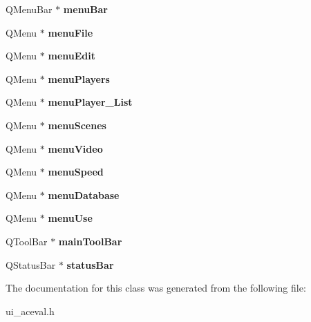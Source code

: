 \begin{DoxyCompactItemize}
\item 
\hypertarget{classUi__AceVal_a7ead7f0196975fdbfb7b5a7733d103f7}{Q\-Menu\-Bar $\ast$ {\bfseries menu\-Bar}}\label{classUi__AceVal_a7ead7f0196975fdbfb7b5a7733d103f7}

\item 
\hypertarget{classUi__AceVal_ac19d54ca34529a87a48184c69968ad43}{Q\-Menu $\ast$ {\bfseries menu\-File}}\label{classUi__AceVal_ac19d54ca34529a87a48184c69968ad43}

\item 
\hypertarget{classUi__AceVal_a8ae66940a199a6d591c0d53fae48a23c}{Q\-Menu $\ast$ {\bfseries menu\-Edit}}\label{classUi__AceVal_a8ae66940a199a6d591c0d53fae48a23c}

\item 
\hypertarget{classUi__AceVal_a5a589f3e32814a24f56e307004169556}{Q\-Menu $\ast$ {\bfseries menu\-Players}}\label{classUi__AceVal_a5a589f3e32814a24f56e307004169556}

\item 
\hypertarget{classUi__AceVal_acbf531762d5836386c1f2e5157380d63}{Q\-Menu $\ast$ {\bfseries menu\-Player\-\_\-\-List}}\label{classUi__AceVal_acbf531762d5836386c1f2e5157380d63}

\item 
\hypertarget{classUi__AceVal_afbb15651ae6c64750dfb41f34b3472df}{Q\-Menu $\ast$ {\bfseries menu\-Scenes}}\label{classUi__AceVal_afbb15651ae6c64750dfb41f34b3472df}

\item 
\hypertarget{classUi__AceVal_a9e8d875ba0f9933e5eee6c99f0c7d8d5}{Q\-Menu $\ast$ {\bfseries menu\-Video}}\label{classUi__AceVal_a9e8d875ba0f9933e5eee6c99f0c7d8d5}

\item 
\hypertarget{classUi__AceVal_aad61789296ac9636dc702a90ffbec0e0}{Q\-Menu $\ast$ {\bfseries menu\-Speed}}\label{classUi__AceVal_aad61789296ac9636dc702a90ffbec0e0}

\item 
\hypertarget{classUi__AceVal_ab4d6d6b7cf40bb75bd55965b8ac8ced7}{Q\-Menu $\ast$ {\bfseries menu\-Database}}\label{classUi__AceVal_ab4d6d6b7cf40bb75bd55965b8ac8ced7}

\item 
\hypertarget{classUi__AceVal_a9bd10db15d09d2b4eef9491cdcc4433e}{Q\-Menu $\ast$ {\bfseries menu\-Use}}\label{classUi__AceVal_a9bd10db15d09d2b4eef9491cdcc4433e}

\item 
\hypertarget{classUi__AceVal_a198506fdae9dfef575b8ff1db6fe3743}{Q\-Tool\-Bar $\ast$ {\bfseries main\-Tool\-Bar}}\label{classUi__AceVal_a198506fdae9dfef575b8ff1db6fe3743}

\item 
\hypertarget{classUi__AceVal_a0ae027537ad14f9b3dcf3d98f1a83af8}{Q\-Status\-Bar $\ast$ {\bfseries status\-Bar}}\label{classUi__AceVal_a0ae027537ad14f9b3dcf3d98f1a83af8}

\end{DoxyCompactItemize}


The documentation for this class was generated from the following file\-:\begin{DoxyCompactItemize}
\item 
ui\-\_\-aceval.\-h\end{DoxyCompactItemize}
